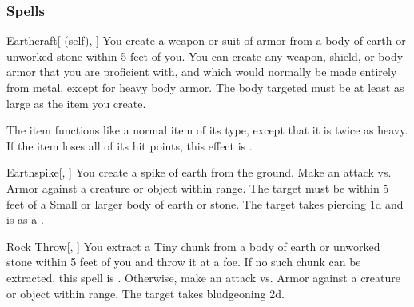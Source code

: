 \subsubsection{Spells}


\lowercase{\hypertarget{spell:Earthcraft}{}}\label{spell:Earthcraft}
\begin{attuneability}[\nth{1}]{\hypertarget{spell:Earthcraft}{Earthcraft}}[ (self), ]
You create a weapon or suit of armor from a body of earth or unworked stone within 5 feet of you.
You can create any weapon, shield, or body armor that you are proficient with, and which would normally be made entirely from metal, except for heavy body armor.
The body targeted must be at least as large as the item you create.

The item functions like a normal item of its type, except that it is twice as heavy.
If the item loses all of its hit points, this effect is .
\end{attuneability}
\vspace{0.25em}



\lowercase{\hypertarget{spell:Earthspike}{}}\label{spell:Earthspike}
\begin{apability}[\nth{1}]{\hypertarget{spell:Earthspike}{Earthspike}}[, ]
You create a spike of earth from the ground.
Make an attack vs. Armor against a creature or object within \rngmed range.
The target must be within 5 feet of a Small or larger body of earth or stone.
\hit The target takes piercing  \plus1d and is  as a .
\end{apability}
\vspace{0.25em}



\lowercase{\hypertarget{spell:Rock Throw}{}}\label{spell:Rock Throw}
\begin{apability}[\nth{1}]{\hypertarget{spell:Rock Throw}{Rock Throw}}[, ]
You extract a Tiny chunk from a body of earth or unworked stone within 5 feet of you and throw it at a foe.
If no such chunk can be extracted, this spell is .
Otherwise, make an attack vs. Armor against a creature or object within \rngmed range.
\hit The target takes bludgeoning  \plus2d.
\end{apability}
\vspace{0.25em}



